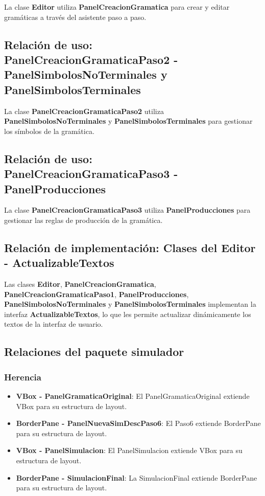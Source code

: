 La clase \textbf{Editor} utiliza \textbf{PanelCreacionGramatica} para crear y editar gramáticas a través del asistente paso a paso.

\subsection{Relación de uso: PanelCreacionGramaticaPaso2 - PanelSimbolosNoTerminales y PanelSimbolosTerminales}

La clase \textbf{PanelCreacionGramaticaPaso2} utiliza \textbf{PanelSimbolosNoTerminales} y \textbf{PanelSimbolosTerminales} para gestionar los símbolos de la gramática.

\subsection{Relación de uso: PanelCreacionGramaticaPaso3 - PanelProducciones}

La clase \textbf{PanelCreacionGramaticaPaso3} utiliza \textbf{PanelProducciones} para gestionar las reglas de producción de la gramática.

\subsection{Relación de implementación: Clases del Editor - ActualizableTextos}

Las clases \textbf{Editor}, \textbf{PanelCreacionGramatica}, \textbf{PanelCreacionGramaticaPaso1}, \textbf{PanelProducciones}, \textbf{PanelSimbolosNoTerminales} y \textbf{PanelSimbolosTerminales} implementan la interfaz \textbf{ActualizableTextos}, lo que les permite actualizar dinámicamente los textos de la interfaz de usuario.

\subsection{Relaciones del paquete simulador}

\subsubsection{Herencia}
\begin{itemize}
    \item \textbf{VBox - PanelGramaticaOriginal}: El PanelGramaticaOriginal extiende VBox para su estructura de layout.
    \item \textbf{BorderPane - PanelNuevaSimDescPaso6}: El Paso6 extiende BorderPane para su estructura de layout.
    \item \textbf{VBox - PanelSimulacion}: El PanelSimulacion extiende VBox para su estructura de layout.
    \item \textbf{BorderPane - SimulacionFinal}: La SimulacionFinal extiende BorderPane para su estructura de layout.
\end{itemize}

